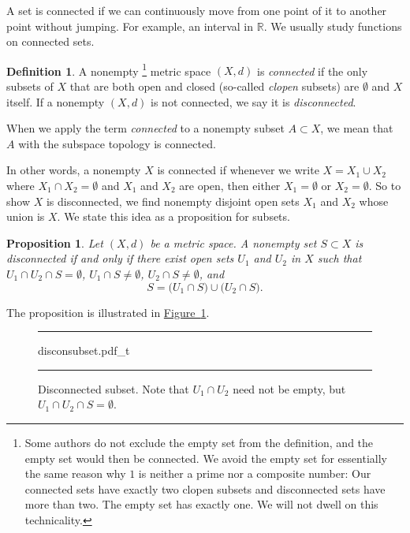 \documentclass[12pt,openany]{book}
\newcommand{\R}{{\mathbb{R}}}
\newcommand{\myindex}[1]{#1\index{#1}}
\theoremstyle{plain}
\newtheorem{prop}[thm]{Proposition}
\theoremstyle{remark}
\theoremstyle{definition}
\newtheorem{defn}[thm]{Definition}
\newenvironment{myfig}{%
\begin{figure}[h!t]
\noindent\rule{\textwidth}{0.5pt}\vspace{12pt}\par\centering}%
{\par\noindent\rule{\textwidth}{0.5pt}
\end{figure}}
\theoremstyle{exercise}
\theoremstyle{example}
\newcommand{\figureref}[1]{\hyperref[#1]{Figure~\ref*{#1}}}
\begin{document}
A set is connected if we can continuously move from one point of it to
another point without jumping.  For example, an interval in $\R$.
We usually study functions on connected sets.

\begin{defn}
A nonempty%
\footnote{Some authors do not exclude the empty set from the definition,
and the empty set would then be connected.
We avoid the empty set for essentially the same reason why
$1$ is neither a prime nor a composite number:  Our connected sets have exactly
two clopen subsets and disconnected sets have more than two.  The empty set
has exactly one.  We will not dwell on this technicality.}
metric space $(X,d)$ is \emph{\myindex{connected}} if the
only subsets of $X$ that are both open and closed (so-called
\emph{\myindex{clopen}} subsets) are $\emptyset$ and $X$ itself.
If a nonempty $(X,d)$ is not connected, we say it is
\emph{\myindex{disconnected}}.

When we apply the term \emph{connected} to a nonempty subset $A \subset X$, we 
mean that $A$ with the subspace topology is connected.
\end{defn}

In other words, a nonempty $X$ is connected if whenever we write
$X = X_1 \cup X_2$ where $X_1 \cap X_2 = \emptyset$ and $X_1$ and $X_2$ are
open, then either $X_1 = \emptyset$ or $X_2 = \emptyset$.
So to show $X$ is disconnected, we find nonempty
disjoint open sets $X_1$ and
$X_2$ whose union is $X$.
We state this idea as a proposition for subsets.

\begin{prop}
Let $(X,d)$ be a metric space.
A nonempty set $S \subset X$ is disconnected if and only if
there exist open sets $U_1$ and
$U_2$ in $X$ such that $U_1 \cap U_2 \cap S = \emptyset$,
$U_1 \cap S \neq \emptyset$,
$U_2 \cap S \neq \emptyset$, and
\begin{equation*}
S = 
\bigl( U_1 \cap S \bigr)
\cup
\bigl( U_2 \cap S \bigr) .
\end{equation*}
\end{prop}

The proposition is illustrated in \figureref{fig:disconsubset}.

\begin{myfig}
{disconsubset.pdf_t}
\caption{Disconnected subset.  Note that $U_1 \cap U_2$ need
not be empty, but $U_1 \cap U_2 \cap S = \emptyset$.\label{fig:disconsubset}}
\end{myfig}
\end{document}
